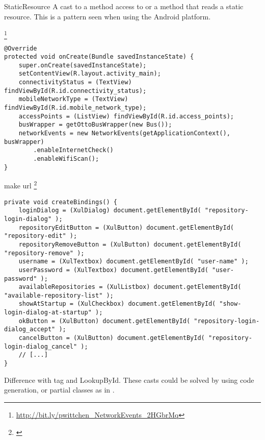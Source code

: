 \begin{pattern}{StaticResource}
%
%
A cast to a method access to  or a method that reads a static resource.
This is a pattern seen when using the Android platform. 

\instances{}

\footnote{\url{http://bit.ly/pwittchen_NetworkEvents_2HGbrMq}}

\begin{verbatim}
@Override
protected void onCreate(Bundle savedInstanceState) {
    super.onCreate(savedInstanceState);
    setContentView(R.layout.activity_main);
    connectivityStatus = (TextView) findViewById(R.id.connectivity_status);
    mobileNetworkType = (TextView) findViewById(R.id.mobile_network_type);
    accessPoints = (ListView) findViewById(R.id.access_points);
    busWrapper = getOttoBusWrapper(new Bus());
    networkEvents = new NetworkEvents(getApplicationContext(), busWrapper)
        .enableInternetCheck()
        .enableWifiScan();
}
\end{verbatim}


make url
\footnote{\url{}}

\begin{verbatim}
private void createBindings() {
    loginDialog = (XulDialog) document.getElementById( "repository-login-dialog" );
    repositoryEditButton = (XulButton) document.getElementById( "repository-edit" );
    repositoryRemoveButton = (XulButton) document.getElementById( "repository-remove" );
    username = (XulTextbox) document.getElementById( "user-name" );
    userPassword = (XulTextbox) document.getElementById( "user-password" );
    availableRepositories = (XulListbox) document.getElementById( "available-repository-list" );
    showAtStartup = (XulCheckbox) document.getElementById( "show-login-dialog-at-startup" );
    okButton = (XulButton) document.getElementById( "repository-login-dialog_accept" );
    cancelButton = (XulButton) document.getElementById( "repository-login-dialog_cancel" );
    // [...]
}
\end{verbatim}


\detection{}

\discussion{}
Difference with tag and LookupById.
%
%
These casts could be solved by using code generation,
or partial classes as in \csharp{}.

\end{pattern}